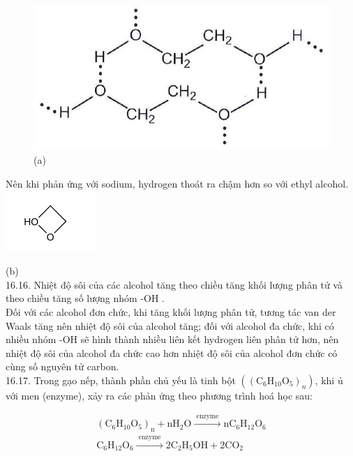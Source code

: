 \documentclass[10pt]{article}
\begin{document}
\begin{figure}[h]
\begin{center}
  \includegraphics[width=\textwidth]{2025_10_23_adad5b98d65ac6665838g-33}
\captionsetup{labelformat=empty}
\caption{(a)}
\end{center}
\end{figure}

Nên khi phản ứng với sodium, hydrogen thoát ra chậm hơn so với ethyl alcohol.\\
\includegraphics{smile-bd02ea0b0ae182fcb9439059b3ade85e832492aa}

(b)\\
16.16. Nhiệt độ sôi của các alcohol tăng theo chiều tăng khối lượng phân tử và theo chiều tăng số lượng nhóm -OH .\\
Đối với các alcohol đơn chức, khi tăng khối lượng phân tử, tương tác van der Waals tăng nên nhiệt độ sôi của alcohol tăng; đối với alcohol đa chức, khi có nhiều nhóm -OH sẽ hình thành nhiều liên kết hydrogen liên phân tử hơn, nên nhiệt độ sôi của alcohol đa chức cao hơn nhiệt độ sôi của alcohol đơn chức có cùng số nguyên tử carbon.\\
16.17. Trong gạo nếp, thành phần chủ yếu là tinh bột $\left(\left(\mathrm{C}_{6} \mathrm{H}_{10} \mathrm{O}_{5}\right)_{n}\right)$, khi ủ với men (enzyme), xảy ra các phản ứng theo phương trình hoá học sau:

$$
\begin{gathered}
\left(\mathrm{C}_{6} \mathrm{H}_{10} \mathrm{O}_{5}\right)_{\mathrm{n}}+\mathrm{nH}_{2} \mathrm{O} \xrightarrow{\text { enzyme }} \mathrm{nC}_{6} \mathrm{H}_{12} \mathrm{O}_{6} \\
\mathrm{C}_{6} \mathrm{H}_{12} \mathrm{O}_{6} \xrightarrow{\text { enzyme }} 2 \mathrm{C}_{2} \mathrm{H}_{5} \mathrm{OH}+2 \mathrm{CO}_{2}
\end{gathered}
$$
\end{document}
